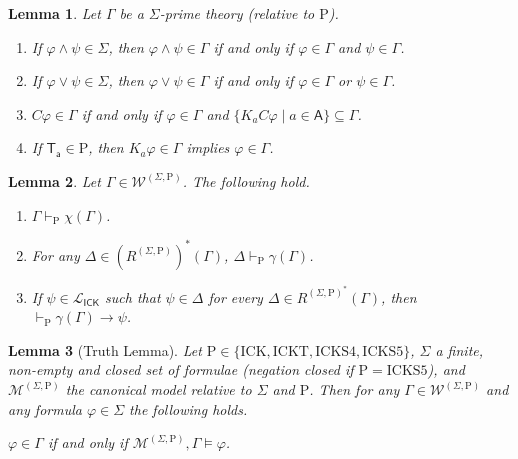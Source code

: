 \documentclass[10pt,a4paper]{amsart}
\newtheorem{lemma}{Lemma}
\newcommand\A{\mathsf{A}}
\newcommand\C {C}
\newcommand{\ICK}{\mathsf{ICK}}
\newcommand{\K}{K}
\newcommand{\LICK}{\mathcal{L}_{\ICK}}
\newcommand{\W}{\mathcal{W}}
\newcommand{\agi}{a}
\newcommand{\fw}{\mathcal{M}}
\newcommand{\hick}{\mathrm{ICK}}
\newcommand{\hickp}{\mathrm{P}}
\newcommand{\hicks}{\mathrm{ICKS4}}
\newcommand{\hickss}{\mathrm{ICKS5}}
\newcommand{\hickt}{\mathrm{ICKT}}
\begin{document}
\begin{lemma}\label{l: properties of prime theories}
    Let $\Gamma$ be a $\Sigma$-prime theory (relative to $\mathrm{P}$).
    \begin{enumerate}
        \item\label{l: properties of prime theories, Item 1} If $\varphi \wedge \psi \in \Sigma$, then $\varphi \wedge \psi \in \Gamma$ if and only if $\varphi \in \Gamma$ and $\psi \in \Gamma$.
        \item\label{l: properties of prime theories, Item 2} If $\varphi \vee \psi \in \Sigma$, then $\varphi \vee \psi \in \Gamma$ if and only if $\varphi \in \Gamma$ or $\psi \in \Gamma$.
        \item\label{l: properties of prime theories, Item 3}  $\C \varphi \in \Gamma$ if and only if $\varphi \in \Gamma$ and $\{\K_\agi \C \varphi \mid \agi \in \A\} \subseteq  \Gamma$.
        \item\label{l: properties of prime theories, Item 4} If $\mathsf{T_\agi} \in \mathrm{P}$, then $\K_\agi \varphi \in \Gamma$ implies $\varphi \in \Gamma$.
    \end{enumerate}
\end{lemma}

\begin{lemma}\label{l: properties characteristic formula IM}
    Let $\Gamma \in \W^{(\Sigma, \hickp)}$.  The following hold.
    \begin{enumerate}
        \item $\Gamma \vdash_\mathrm{P} \chi(\Gamma)$.
        \item For any $\Delta \in (R^{(\Sigma,\hickp)})^*(\Gamma)$, $\Delta \vdash_\mathrm{P} \gamma(\Gamma)$.
        \item If $\psi \in \LICK$ such that $\psi \in \Delta$ for every $\Delta \in R^{(\Sigma, \hickp)^*}(\Gamma)$, then $\vdash_\mathrm{P} \gamma(\Gamma) \rightarrow \psi$.
    \end{enumerate}
\end{lemma}

\begin{lemma}[Truth Lemma] \label{l: truth lemma}
Let $\hickp \in \{\hick, \hickt, \hicks, \hickss\}$, $\Sigma$ a finite, non-empty and closed set of formulae (negation closed if $\hickp = \hickss$), and $\fw^{(\Sigma, \hickp)}$ the canonical model relative to $\Sigma$ and $\hickp$. Then for any $\Gamma \in \W^{(\Sigma, \hickp)}$ and any formula $\varphi \in \Sigma$ the following holds.
\begin{center}
    $\varphi \in \Gamma$ if and only if $\fw^{(\Sigma, \hickp)}, \Gamma \models \varphi$.
\end{center}
\end{lemma}
\end{document}
